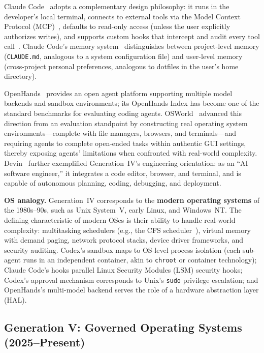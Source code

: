 \documentclass[11pt,a4paper]{article}
\begin{document}
Claude Code~\cite{anthropic_claudecode_overview_2026} adopts a complementary design philosophy: it runs in the developer's local terminal, connects to external tools via the Model Context Protocol (MCP)~\cite{mcp_intro_2026}, defaults to read-only access (unless the user explicitly authorizes writes), and supports custom hooks that intercept and audit every tool call~\cite{anthropic_claudecode_security_2026}.
Claude Code's memory system~\cite{anthropic_claudecode_memory_2026} distinguishes between project-level memory (\texttt{CLAUDE.md}, analogous to a system configuration file) and user-level memory (cross-project personal preferences, analogous to dotfiles in the user's home directory).

OpenHands~\cite{openhands_paper_2025} provides an open agent platform supporting multiple model backends and sandbox environments; its OpenHands Index has become one of the standard benchmarks for evaluating coding agents.
OSWorld~\cite{osworld2024} advanced this direction from an evaluation standpoint by constructing real operating system environments---complete with file managers, browsers, and terminals---and requiring agents to complete open-ended tasks within authentic GUI settings, thereby exposing agents' limitations when confronted with real-world complexity.
Devin~\cite{devin2024cognition} further exemplified Generation~IV's engineering orientation: as an ``AI software engineer,'' it integrates a code editor, browser, and terminal, and is capable of autonomous planning, coding, debugging, and deployment.

\textbf{OS analogy.}
Generation~IV corresponds to the \textbf{modern operating systems} of the 1980s--90s, such as Unix System~V, early Linux, and Windows~NT.
The defining characteristic of modern OSes is their ability to handle real-world complexity: multitasking schedulers (e.g., the CFS scheduler~\cite{linux_cfs_2026}), virtual memory with demand paging, network protocol stacks, device driver frameworks, and security auditing.
Codex's sandbox maps to OS-level process isolation (each sub-agent runs in an independent container, akin to \texttt{chroot} or container technology); Claude Code's hooks parallel Linux Security Modules (LSM) security hooks; Codex's approval mechanism corresponds to Unix's \texttt{sudo} privilege escalation; and OpenHands's multi-model backend serves the role of a hardware abstraction layer (HAL).

\subsection{Generation V: Governed Operating Systems (2025--Present)}
\end{document}
